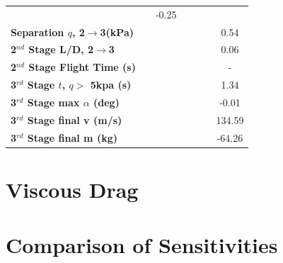 \begin{table}[ht]
\begin{tabular}{l c c c c c c}
		& \secondthirdSeparationgammaTThreeOneHundredTen
		&-0.25
		\\
		\textbf{Separation $q$, 2$\rightarrow$3(kPa)}
		& \secondthirdSeparationqTThreeNinety
		& \secondthirdSeparationqTThreeNinetyFive
		& \secondthirdSeparationqTThreeStandard
		& \secondthirdSeparationqTThreeOneHundredFive
		& \secondthirdSeparationqTThreeOneHundredTen
		&0.54
		\\
		\textbf{2$^{nd}$ Stage L/D, 2$\rightarrow$3}
		& \secondthirdSeparationLDTThreeNinety
		& \secondthirdSeparationLDTThreeNinetyFive
		& \secondthirdSeparationLDTThreeStandard
		& \secondthirdSeparationLDTThreeOneHundredFive
		& \secondthirdSeparationLDTThreeOneHundredTen
		&0.06
		\\
		\textbf{2$^{nd}$ Stage Flight Time (s)}
		& \secondFlightTimeTThreeNinety
		& \secondFlightTimeTThreeNinetyFive
		& \secondFlightTimeTThreeStandard
		& \secondFlightTimeTThreeOneHundredFive
		& \secondFlightTimeTThreeOneHundredTen
		& -
		\\
		\textbf{3$^{rd}$ Stage $t$, $q >$ 5kpa (s)}
		& \thirdqOverFiveTThreeNinety
		& \thirdqOverFiveTThreeNinetyFive
		& \thirdqOverFiveTThreeStandard
		& \thirdqOverFiveTThreeOneHundredFive
		& \thirdqOverFiveTThreeOneHundredTen
		&1.34
		\\
		\textbf{3$^{rd}$ Stage max $\alpha$ (deg)}
		& \thirdmaxAoATThreeNinety
		& \thirdmaxAoATThreeNinetyFive
		& \thirdmaxAoATThreeStandard
		& \thirdmaxAoATThreeOneHundredFive
		& \thirdmaxAoATThreeOneHundredTen
		&-0.01
		\\
		\textbf{3$^{rd}$ Stage final v (m/s)}
		& \thirdcircvTThreeNinety
		& \thirdcircvTThreeNinetyFive
		& \thirdcircvTThreeStandard
		& \thirdcircvTThreeOneHundredFive
		& \thirdcircvTThreeOneHundredTen
		&134.59
		\\
		\textbf{3$^{rd}$ Stage final m (kg)}
		& \thirdcircmTThreeNinety
		& \thirdcircmTThreeNinetyFive
		& \thirdcircmTThreeStandard
		& \thirdcircmTThreeOneHundredFive
		& \thirdcircmTThreeOneHundredTen
		&-64.26
		\\
		\hline 
	\end{tabular} 
\end{table}


\section{Viscous Drag}



\section{Comparison of Sensitivities}

